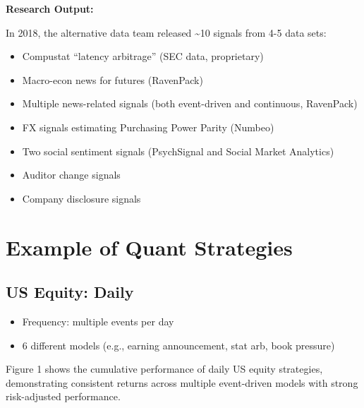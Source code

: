 \documentclass[11pt, letterpaper]{article}
\begin{document}
  \textbf{Research Output:}

  In 2018, the alternative data team released \textasciitilde10 signals from
  4-5 data sets:

  \begin{itemize}
    \item Compustat ``latency arbitrage'' (SEC data, proprietary)

    \item Macro-econ news for futures (RavenPack)

    \item Multiple news-related signals (both event-driven and
      continuous, RavenPack)

    \item FX signals estimating Purchasing Power Parity (Numbeo)

    \item Two social sentiment signals (PsychSignal and Social Market
      Analytics)

    \item Auditor change signals

    \item Company disclosure signals
  \end{itemize}

  \section{Example of Quant Strategies}
  \label{example-of-quant-strategies}

  \subsection{US Equity: Daily}
  \label{us-equity-daily}

  \begin{itemize}
    \item Frequency: multiple events per day

    \item 6 different models (e.g., earning announcement, stat arb, book
      pressure)
  \end{itemize}

  Figure 1 shows the cumulative performance of daily US equity strategies,
  demonstrating consistent returns across multiple event-driven models with
  strong risk-adjusted performance.
\end{document}
